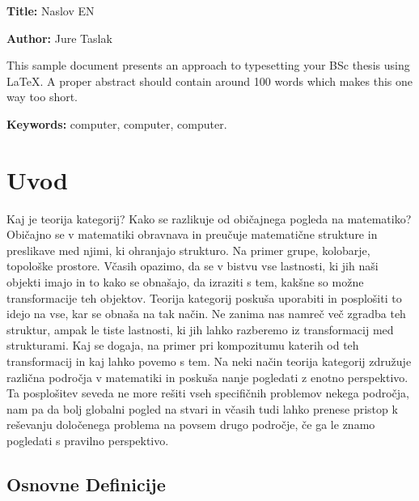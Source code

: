 \documentclass[12pt,a4paper]{book}
\newcommand{\ttitleEn}{Naslov EN}
\newcommand{\tauthor}{Jure Taslak}
\newcommand{\tkeywordsEn}{computer, computer, computer}
\newcommand{\clearemptydoublepage}{\newpage{\pagestyle{empty}\cleardoublepage}}
\theoremstyle{definition}
\theoremstyle{plain}
\theoremstyle{definition}
\theoremstyle{remark}
\begin{document}
\noindent\textbf{Title:} \ttitleEn
\bigskip

\noindent\textbf{Author:} \tauthor
\bigskip

\noindent This sample document presents an approach to typesetting your BSc thesis using \LaTeX. 
A proper abstract should contain around 100 words which makes this one way too short.
\bigskip

\noindent\textbf{Keywords:} \tkeywordsEn.
\clearemptydoublepage

\mainmatter
\setcounter{page}{1}
\pagestyle{fancy}

\chapter{Uvod}
Kaj je teorija kategorij? Kako se razlikuje od običajnega pogleda na matematiko? Običajno se v matematiki obravnava in preučuje matematične strukture in preslikave med njimi, ki ohranjajo strukturo. Na primer grupe, kolobarje, topološke prostore. Včasih opazimo, da se v bistvu vse lastnosti, ki jih naši objekti imajo in to kako se obnašajo, da izraziti s tem, kakšne so možne transformacije teh objektov. Teorija kategorij poskuša uporabiti in posplošiti to idejo na vse, kar se obnaša na tak način. Ne zanima nas namreč več zgradba teh struktur, ampak le tiste lastnosti, ki jih lahko razberemo iz transformacij med strukturami. Kaj se dogaja, na primer pri kompozitumu katerih od teh transformacij in kaj lahko povemo s tem. Na neki način teorija kategorij združuje različna področja v matematiki in poskuša nanje pogledati z enotno perspektivo. Ta posplošitev seveda ne more rešiti vseh specifičnih problemov nekega področja, nam pa da bolj globalni pogled na stvari in včasih tudi lahko prenese pristop k reševanju določenega problema na povsem drugo področje, če ga le znamo pogledati s pravilno perspektivo.

\section{Osnovne Definicije}
\end{document}
